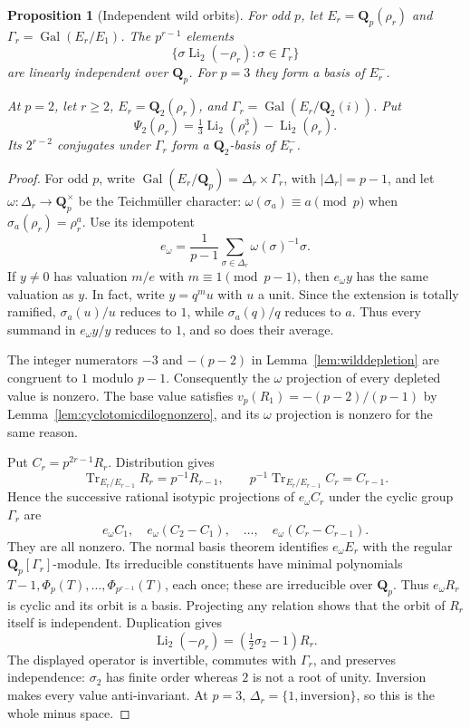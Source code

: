 \documentclass[11pt,a4paper]{article}
\newtheorem{proposition}[theorem]{Proposition}
\theoremstyle{remark}
\newcommand{\Q}{\mathbf Q}
\newcommand{\Gal}{\operatorname{Gal}}
\begin{document}
\begin{proposition}[Independent wild orbits]\label{prop:wildorbit}
For odd $p$, let $E_r=\Q_p(\rho_r)$ and
$\Gamma_r=\Gal(E_r/E_1)$.
The $p^{r-1}$ elements
\[
 \{\sigma\operatorname{Li}_2(-\rho_r):\sigma\in\Gamma_r\}
\]
are linearly independent over $\Q_p$.
For $p=3$ they form a basis of $E_r^-$.

At $p=2$, let $r\geq2$, $E_r=\Q_2(\rho_r)$, and
$\Gamma_r=\Gal(E_r/\Q_2(i))$.
Put
\[
 \Psi_2(\rho_r)=\tfrac13\operatorname{Li}_2(\rho_r^3)
                              -\operatorname{Li}_2(\rho_r).
\]
Its $2^{r-2}$ conjugates under $\Gamma_r$ form a $\Q_2$-basis of
$E_r^-$.
\end{proposition}
\begin{proof}
For odd $p$, write
$\Gal(E_r/\Q_p)=\Delta_r\times\Gamma_r$, with $|\Delta_r|=p-1$,
and let $\omega:\Delta_r\to\Q_p^\times$ be the Teichm\"uller
character: $\omega(\sigma_a)\equiv a\pmod p$ when
$\sigma_a(\rho_r)=\rho_r^a$.
Use its idempotent
\[
 e_\omega=\frac1{p-1}\sum_{\sigma\in\Delta_r}
                        \omega(\sigma)^{-1}\sigma.
\]
If $y\ne0$ has valuation $m/e$ with $m\equiv1\pmod{p-1}$,
then $e_\omega y$ has the same valuation as $y$.
In fact, write $y=q^m u$ with $u$ a unit. Since the extension is
totally ramified, $\sigma_a(u)/u$ reduces to $1$, while
$\sigma_a(q)/q$ reduces to $a$. Thus every summand in
$e_\omega y/y$ reduces to $1$, and so does their average.

The integer numerators $-3$ and $-(p-2)$ in
Lemma~\ref{lem:wilddepletion} are congruent to $1$ modulo $p-1$.
Consequently the $\omega$ projection of every depleted value is nonzero.
The base value satisfies
$v_p(R_1)=-(p-2)/(p-1)$ by
Lemma~\ref{lem:cyclotomicdilognonzero}, and its $\omega$ projection
is nonzero for the same reason.

Put $C_r=p^{2r-1}R_r$.
Distribution \cite[Proposition~2.10(1)]{BesserDeJeuAlgorithm} gives
\[
 \operatorname{Tr}_{E_r/E_{r-1}}R_r=p^{-1}R_{r-1},
 \qquad p^{-1}\operatorname{Tr}_{E_r/E_{r-1}}C_r=C_{r-1}.
\]
Hence the successive rational isotypic projections of
$e_\omega C_r$ under the cyclic group $\Gamma_r$ are
\[
 e_\omega C_1,\quad e_\omega(C_2-C_1),\quad\ldots,
 \quad e_\omega(C_r-C_{r-1}).
\]
They are all nonzero. The normal basis theorem identifies
$e_\omega E_r$ with the regular $\Q_p[\Gamma_r]$-module.
Its irreducible constituents have minimal polynomials
$T-1,\Phi_p(T),\ldots,\Phi_{p^{r-1}}(T)$, each once;
these are irreducible over $\Q_p$.
Thus $e_\omega R_r$ is cyclic and its orbit is a basis.
Projecting any relation shows that the orbit of $R_r$ itself
is independent. Duplication gives
\[
 \operatorname{Li}_2(-\rho_r)=(\tfrac12\sigma_2-1)R_r.
\]
The displayed operator is invertible, commutes with $\Gamma_r$,
and preserves independence: $\sigma_2$ has finite order whereas
$2$ is not a root of unity.
Inversion makes every value anti-invariant. At $p=3$,
$\Delta_r=\{1,\text{inversion}\}$, so this is the whole minus space.


\end{proof}
\end{document}
